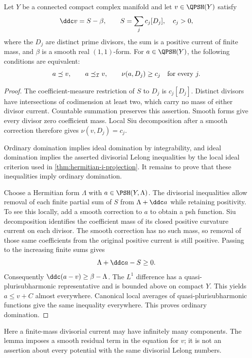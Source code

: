 \begin{lemma}\label{lem:divisorial-potential-domination}
Let $Y$ be a connected compact complex manifold and let $v\in\QPSH(Y)$ satisfy
\[
 \ddc v=S-\beta,\qquad
 S=\sum_j c_j[D_j],\quad c_j>0,
\]
where the $D_j$ are distinct prime divisors, the sum is a positive current of finite mass, and $\beta$ is a smooth real $(1,1)$-form. For $a\in\QPSH(Y)$, the following conditions are equivalent:
\[
 a\preceq v,\qquad a\preceq_{\mathcal I}v,\qquad
 \nu(a,D_j)\geq c_j\quad\hbox{for every }j.
\]
\end{lemma}
\begin{proof}
The coefficient-measure restriction of $S$ to $D_j$ is $c_j[D_j]$. Distinct divisors have intersections of codimension at least two, which carry no mass of either divisor current. Countable summation preserves this assertion. Smooth forms give every divisor zero coefficient mass. Local Siu decomposition after a smooth correction therefore gives $\nu(v,D_j)=c_j$.

Ordinary domination implies ideal domination by integrability, and ideal domination implies the asserted divisorial Lelong inequalities by the local ideal criterion used in \cref{thm:hermitian-i-projection}. It remains to prove that these inequalities imply ordinary domination.

Choose a Hermitian form $\Lambda$ with $a\in\PSH(Y,\Lambda)$. The divisorial inequalities allow removal of each finite partial sum of $S$ from $\Lambda+\ddc a$ while retaining positivity. To see this locally, add a smooth correction to $a$ to obtain a psh function. Siu decomposition identifies the coefficient mass of its closed positive curvature current on each divisor. The smooth correction has no such mass, so removal of those same coefficients from the original positive current is still positive. Passing to the increasing finite sums gives
\[
 \Lambda+\ddc a-S\geq0.
\]
Consequently $\ddc(a-v)\geq\beta-\Lambda$. The $L^1$ difference has a quasi-plurisubharmonic representative and is bounded above on compact $Y$. This yields $a\leq v+C$ almost everywhere. Canonical local averages of quasi-plurisubharmonic functions give the same inequality everywhere. This proves ordinary domination.
\end{proof}

Here a finite-mass divisorial current may have infinitely many components. The lemma imposes a smooth residual term in the equation for $v$; it is not an assertion about every potential with the same divisorial Lelong numbers.

